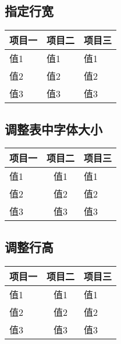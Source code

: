     \subsection{指定行宽}

    \begin{table}[H]
    \centering
    \label{tab:tabsty-2}
    \begin{tabular}{ p{2cm}<{\centering} p{2cm}<{\centering} p{2cm}<{\centering}  }
    \toprule
    项目一 & 项目二 & 项目三 \\
    \midrule
     值1 & 值1 & 值1 \\
     值2 & 值2 & 值2 \\
     值3 & 值3 & 值3 \\
    \bottomrule
    \end{tabular}
    \end{table}

    \subsection{调整表中字体大小}

    \begin{table}[H]
    \centering
    \label{tab:tabsty-3}
    \small
    \begin{tabular}{lcl}
    \toprule
    项目一 & 项目二 & 项目三 \\
    \midrule
     值1 & 值1 & 值1 \\
     值2 & 值2 & 值2 \\
     值3 & 值3 & 值3 \\
    \bottomrule
    \end{tabular}
    \end{table}

    \subsection{调整行高}

    \renewcommand\arraystretch{2}
    \begin{table}[H]
    \centering
    \label{tab:tabsty-4}
    \begin{tabular}{lcl}
    \toprule
    项目一 & 项目二 & 项目三 \\
    \midrule
     值1 & 值1 & 值1 \\
     值2 & 值2 & 值2 \\
     值3 & 值3 & 值3 \\
    \bottomrule
    \end{tabular}
    \end{table}

